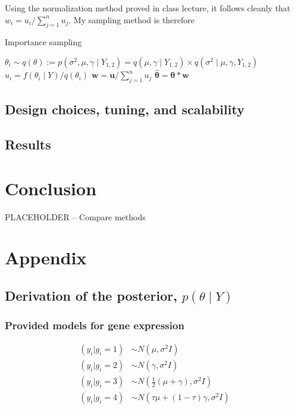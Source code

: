 \documentclass{article}
\begin{document}
Using the normalization method proved in class lecture, it follows cleanly that $w_i = u_i / \sum_{j=1}^nu_j$. My sampling method is therefore
\begin{algorithm}
\caption{Importance sampling}
  \begin{algorithmic}[1]
      \State $\theta_i \sim q(\theta) := p(\sigma^2, \mu, \gamma \mid Y_{1,2})= q(\mu, \gamma \mid Y_{1,2}) \times q(\sigma^2 \mid \mu, \gamma, Y_{1,2})$
      \State $u_i = f(\theta_i \mid Y) / q(\theta_i)$  
    \EndFor
    \State $\textbf{w} = \textbf{u} / \sum_{j=1}^n u_j$ 
    \State $\hat{\boldsymbol{\theta}} = \boldsymbol{\theta}*\textbf{w}$  
  \end{algorithmic}
\end{algorithm}
\subsection*{Design choices, tuning, and scalability}
\subsection*{Results}

\section{Conclusion}
PLACEHOLDER -- Compare methods

\section{Appendix}
\subsection{Derivation of the posterior, $p(\theta \mid Y)$}
\subsubsection{Provided models for gene expression}
\begin{align*}
  (y_i | g_i = 1) &\sim N(\mu, \sigma^2 I)\\
  (y_i | g_i = 2) &\sim N(\gamma, \sigma^2 I)\\
  (y_i | g_i = 3) &\sim N(\frac{1}{2}(\mu + \gamma), \sigma^2 I)\\
  (y_i | g_i = 4) &\sim N(\tau\mu + (1-\tau)\gamma, \sigma^2 I)
\end{align*}
\end{document}
